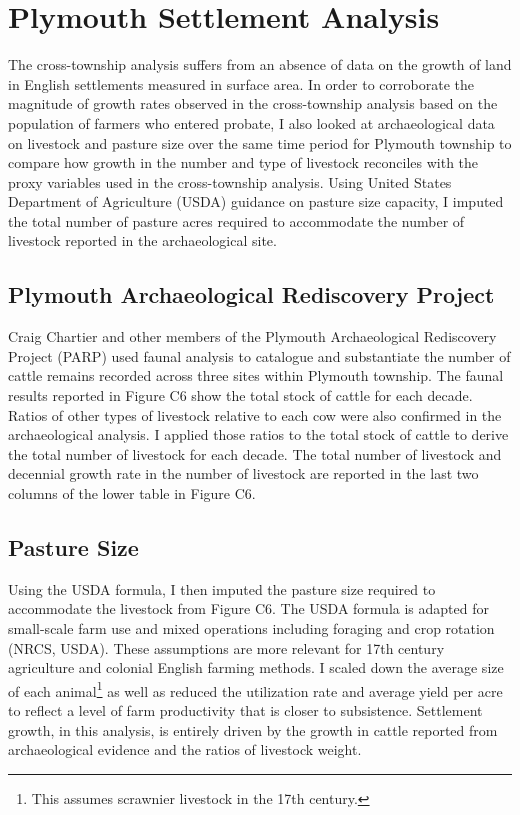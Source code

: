 \documentclass[sn-mathphys]{sn-jnl}%
\theoremstyle{thmstyleone}%
\theoremstyle{thmstyletwo}%
\theoremstyle{thmstylethree}%
\begin{document}
\section{Plymouth Settlement Analysis}\label{sec5}

The cross-township analysis suffers from an absence of data on the growth of land in English settlements measured in surface area. In order to corroborate the magnitude of growth rates observed in the cross-township analysis based on the population of farmers who entered probate, I also looked at archaeological data on livestock and pasture size over the same time period for Plymouth township to compare how growth in the number and type of livestock reconciles with the proxy variables used in the cross-township analysis. Using United States Department of Agriculture (USDA) guidance on pasture size capacity, I imputed the total number of pasture acres required to accommodate the number of livestock reported in the archaeological site.

\subsection{Plymouth Archaeological Rediscovery Project}

Craig Chartier and other members of the Plymouth Archaeological Rediscovery Project (PARP) used faunal analysis to catalogue and substantiate the number of cattle remains recorded across three sites within Plymouth township. The faunal results reported in Figure C6 show the total stock of cattle for each decade. Ratios of other types of livestock relative to each cow were also confirmed in the archaeological analysis. I applied those ratios to the total stock of cattle to derive the total number of livestock for each decade. The total number of livestock and decennial growth rate in the number of livestock are reported in the last two columns of the lower table in Figure C6.

\subsection{Pasture Size}

Using the USDA formula, I then imputed the pasture size required to accommodate the livestock from Figure C6. The USDA formula is adapted for small-scale farm use and mixed operations including foraging and crop rotation (NRCS, USDA). These assumptions are more relevant for 17th century agriculture and colonial English farming methods. I scaled down the average size of each animal\footnote{This assumes scrawnier livestock in the 17th century.} as well as reduced the utilization rate and average yield per acre to reflect a level of farm productivity that is closer to subsistence. Settlement growth, in this analysis, is entirely driven by the growth in cattle reported from archaeological evidence and the ratios of livestock weight.
\end{document}
